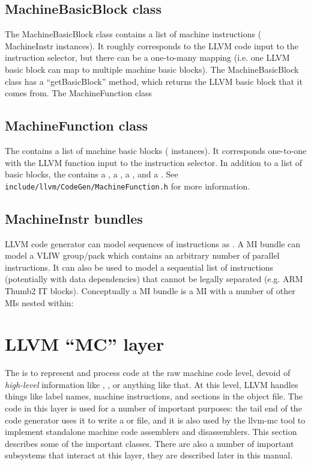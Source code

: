 \documentclass{myproc}
\begin{document}
\subsection{MachineBasicBlock class}
The MachineBasicBlock class contains a list of machine instructions ( MachineInstr instances). It roughly corresponds to the LLVM code input to the instruction selector, but there can be a one-to-many mapping (i.e. one LLVM basic block can map to multiple machine basic blocks). The MachineBasicBlock class has a “getBasicBlock” method, which returns the LLVM basic block that it comes from.
The MachineFunction class

\subsection{MachineFunction class}
The  contains a list of machine basic blocks
( instances). It corresponds one-to-one with the LLVM
function input to the instruction selector. In addition to a list of basic
blocks, the 
 contains a , a
, a , and a
. See
\verb+include/llvm/CodeGen/MachineFunction.h+ for more information. 

\subsection{MachineInstr bundles}
LLVM code generator can model sequences of instructions as . A MI bundle can model a VLIW group/pack which contains an
arbitrary number of parallel instructions. It can also be used to model a
sequential list of instructions (potentially with data dependencies) that
cannot be legally separated (e.g. ARM Thumb2 IT blocks). Conceptually a MI
bundle is a MI with a number of other MIs nested within:  

\section{LLVM ``MC'' layer}
The  is to represent and process code at the raw machine code
level, devoid of {\em high-level\/} information like ,
,  or anything like that. At this level,
LLVM handles things like label names, machine instructions, and sections in
the object file. The code in this layer is used for a number of important
purposes: the tail end of the code generator uses it to write a  or
 file, and it is also used by the llvm-mc tool to implement standalone
machine code assemblers and disassemblers.  
This section describes some of the important classes. There are also a number of important subsystems that interact at this layer, they are described later in this manual.
\end{document}
